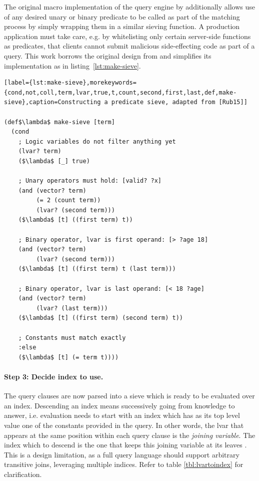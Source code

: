 The original macro implementation of the query engine by \cite{rubin15aosadb} additionally allows use of any desired unary or binary predicate to be called as part of the matching process by simply wrapping them in a similar sieving function. A production application must take care, e.g. by whitelisting only certain server-side functions as predicates, that clients cannot submit malicious side-effecting code as part of a query. This work borrows the original design from \cite{rubin15aosadb} and simplifies its implementation as in listing~\ref{lst:make-sieve}.


\begin{lstlisting}[label={lst:make-sieve},morekeywords={cond,not,coll,term,lvar,true,t,count,second,first,last,def,make-sieve},caption=Constructing a predicate sieve, adapted from [Rub15]]

(def$\lambda$ make-sieve [term]
  (cond
    ; Logic variables do not filter anything yet
    (lvar? term)
    ($\lambda$ [_] true)

    ; Unary operators must hold: [valid? ?x]
    (and (vector? term)
         (= 2 (count term))
         (lvar? (second term)))
    ($\lambda$ [t] ((first term) t))

    ; Binary operator, lvar is first operand: [> ?age 18]
    (and (vector? term)
         (lvar? (second term)))
    ($\lambda$ [t] ((first term) t (last term)))

    ; Binary operator, lvar is last operand: [< 18 ?age]
    (and (vector? term)
         (lvar? (last term)))
    ($\lambda$ [t] ((first term) (second term) t))

    ; Constants must match exactly
    :else
    ($\lambda$ [t] (= term t))))

\end{lstlisting}


\cleardoublepage
\paragraph{Step 3: Decide index to use.}
The query clauses are now parsed into a sieve which is ready to be evaluated over an index. Descending an index means successively going from knowledge to answer, i.e. evaluation needs to start with an index which has as its top level value one of the constants provided in the query. In other words, the lvar that appears at the same position within each query clause is the \emph{joining variable}. The index which to descend is the one that keeps this joining variable at its leaves \cite{rubin15aosadb}. This is a design limitation, as a full query language should support arbitrary transitive joins, leveraging multiple indices. Refer to table \ref{tbl:lvartoindex} for clarification.

